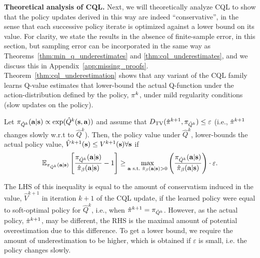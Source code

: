 \textbf{Theoretical analysis of CQL.}
Next, we will theoretically analyze CQL to show that the policy updates derived in this way are indeed ``conservative'', in the sense that each successive policy iterate is optimized against a lower bound on its value. For clarity, we state the results in the absence of finite-sample error, in this section, but sampling error can be incorporated in the same way as Theorems~\ref{thm:min_q_underestimates} and \ref{thm:cql_underestimates}, and we discuss this in Appendix~\ref{app:missing_proofs}.   Theorem~\ref{thm:cql_underestimation} shows that any variant of the CQL family learns Q-value estimates that lower-bound the actual Q-function under the action-distribution defined by the policy, $\pi^{k}$, under mild regularity conditions (slow updates on the policy).
\begin{theorem}
\label{thm:cql_underestimation}
Let $\pi_{\hat{Q}^k}(\mathbf{a} | \mathbf{s}) \propto \exp(\hat{Q}^k(\mathbf{s}, \mathbf{a}))$ and assume that $D_{\mathrm{TV}}(\hat{\pi}^{k+1}, \pi_{\hat{Q}^k}) \leq \varepsilon$ (i.e., $\hat{\pi}^{k+1}$ changes slowly w.r.t to $\hat{Q}^k$). Then, the policy value under $\hat{Q}^k$, lower-bounds the actual policy value, \mbox{$\hat{V}^{k+1}(\mathbf{s}) \leq V^{k+1}(\mathbf{s}) \forall \mathbf{s}$} if
\begin{equation*}
\small{\mathbb{E}_{\pi_{\hat{Q}^k}(\mathbf{a}| \mathbf{s})} \left[ \frac{\pi_{\hat{Q}^k}(\mathbf{a}| \mathbf{s})}{\hat{\pi}_\beta(\mathbf{a}|\mathbf{s})} -1 \right] \geq \max_{\mathbf{a}\text{~s.t.~} \hat{\pi}_\beta(\mathbf{a}|\mathbf{s}) > 0} \left(\frac{\pi_{\hat{Q}^k}(\mathbf{a}| \mathbf{s})}{\hat{\pi}_\beta(\mathbf{a}|\mathbf{s})} \right) \cdot \varepsilon}. 
\end{equation*}
\end{theorem}
The LHS of this inequality is equal to the amount of conservatism induced in the value, $\hat{V}^{k+1}$ in iteration $k+1$ of the CQL update,
if the learned policy were equal to soft-optimal policy for $\hat{Q}^k$, i.e., when $\hat{\pi}^{k+1} = \pi_{\hat{Q}^k}$. However, as the actual policy, $\hat{\pi}^{k+1}$, may be different, the RHS is the maximal amount of potential overestimation due to this difference. To get a lower bound, we require the amount of underestimation to be higher, which is obtained if $\varepsilon$ is small, i.e. the policy changes slowly.  

